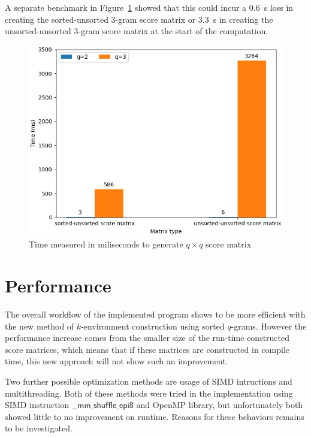 \documentclass[twoside,a4paper,bsc]{master}
\newcommand{\Qgram}[1]{\(#1\)-gram}
\begin{document}
A separate benchmark in
Figure~\ref{fig:scorematrix} showed that this could incur a 0.6~s loss in
creating the sorted-unsorted \Qgram{3} score matrix or 3.3~s in creating
the unsorted-unsorted \Qgram{3} score matrix at the start of the
computation.

\begin{figure}
\centering
\includegraphics[scale=0.7]{graphics/scorematrix.png}
\caption{Time measured in miliseconds to generate \(q\times q\) score
matrix}
\label{fig:scorematrix}
\end{figure}

\section{Performance}
The overall workflow of the implemented program shows to be more efficient with 
the new method of \(k\)-environment construction using sorted \Qgram{q}s. 
However the performance increase comes from the smaller size of the run-time
constructed score matrices, which means that if these matrices are constructed 
in compile time, this new approach will not show such an improvement. 

Two further possible optimization methods are usage of SIMD intructions and
multithreading. Both of these methods were tried in the implementation
using
SIMD instruction \(\mathsf{\_\_mm\_shuffle\_epi8}\) and OpenMP library, but
unfortunately both showed little to no improvement on runtime. Reasons for
these behaviors remains to be investigated.
\end{document}
